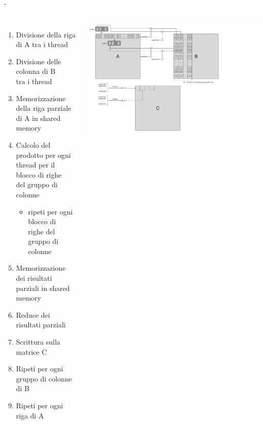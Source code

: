 \documentclass[compress]{beamer}
\begin{document}
\begin{frame}{\secname \text{ }- \subsecname\ }
    \begin{columns}
        \begin{minipage}[b]{1\textwidth}
            \begin{enumerate}
                \item Divisione della riga di A tra i thread
                \item Divisione delle colonna di B \\ tra i thread
                \item Memorizzazione della riga parziale di A in shared memory
                \item Calcolo del prodotto per ogni thread per il blocco di righe \\ del gruppo di colonne 
                \begin{itemize}
                    \item ripeti per ogni blocco di \\ righe del gruppo di colonne
                \end{itemize}
                \item Memorizzazione dei risultati parziali in shared memory
                \item Reduce dei risultati parziali 
                \item Scrittura sulla matrice C
                \item Ripeti per ogni gruppo di colonne di B
                \item Ripeti per ogni riga di A
            \end{enumerate}
        \end{minipage}
        \begin{minipage}{1.25\textwidth}
            \begin{adjustbox}{margin=0cm 1cm 0cm 0cm, center} %
                \includegraphics[width=1.1\textwidth]{resources/cuda_scheme_v3.png}
            \end{adjustbox}
        \end{minipage}
        
    \end{columns}
\end{frame}
\end{document}
